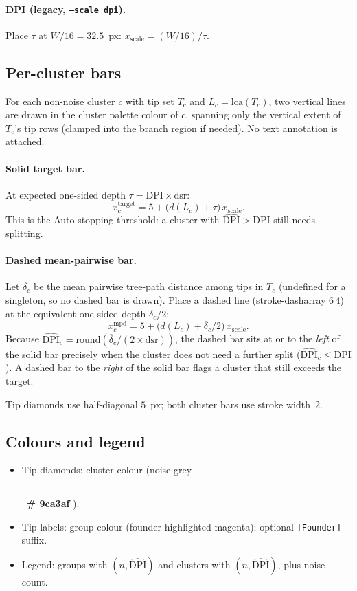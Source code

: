 \documentclass[11pt,a4paper]{article}
\newcommand{\hexswatch}[2]{%
  \textcolor{#1}{\rule{0.9em}{0.9em}}\,%
  \textcolor{#1}{\textbf{\upshape\# #2}}%
}
\begin{document}
\paragraph{DPI (legacy, \texttt{--scale dpi}).}
Place $\tau$ at $W/16=32.5$~px:
$x_{\mathrm{scale}}=(W/16)/\tau$.

\subsection{Per-cluster bars}
\label{sec:cluster-bars}
For each non-noise cluster $c$ with tip set $T_c$ and
$L_c=\mathrm{lca}(T_c)$, two vertical lines are drawn in the cluster palette
colour of $c$, spanning only the vertical extent of $T_c$'s tip rows
(clamped into the branch region if needed). No text annotation is attached.

\paragraph{Solid target bar.}
At expected one-sided depth $\tau=\mathrm{DPI}\times\mathrm{dsr}$:
\[
  x_c^{\mathrm{target}}=5+\bigl(d(L_c)+\tau\bigr)\,x_{\mathrm{scale}}.
\]
This is the Auto stopping threshold: a cluster with
$\widehat{\mathrm{DPI}}>\mathrm{DPI}$ still needs splitting.

\paragraph{Dashed mean-pairwise bar.}
Let $\overline{\delta}_c$ be the mean pairwise tree-path distance among tips
in $T_c$ (undefined for a singleton, so no dashed bar is drawn).
Place a dashed line (stroke-dasharray $6\,4$) at the equivalent one-sided
depth $\overline{\delta}_c/2$:
\[
  x_c^{\mathrm{mpd}}=5+\bigl(d(L_c)+\overline{\delta}_c/2\bigr)\,x_{\mathrm{scale}}.
\]
Because
$\widehat{\mathrm{DPI}}_c=\mathrm{round}(\overline{\delta}_c/(2\times\mathrm{dsr}))$,
the dashed bar sits at or to the \emph{left} of the solid bar precisely when
the cluster does not need a further split
($\widehat{\mathrm{DPI}}_c\le\mathrm{DPI}$).
A dashed bar to the \emph{right} of the solid bar flags a cluster that still
exceeds the target.

Tip diamonds use half-diagonal $5$~px;
both cluster bars use stroke width~$2$.

\subsection{Colours and legend}
\begin{itemize}[nosep]
  \item Tip diamonds: cluster colour (noise grey \hexswatch{palNoise}{9ca3af}).
  \item Tip labels: group colour (founder highlighted magenta); optional
        \texttt{[Founder]} suffix.
  \item Legend: groups with $(n,\widehat{\mathrm{DPI}})$ and clusters with
        $(n,\widehat{\mathrm{DPI}})$, plus noise count.
\end{itemize}
\end{document}
